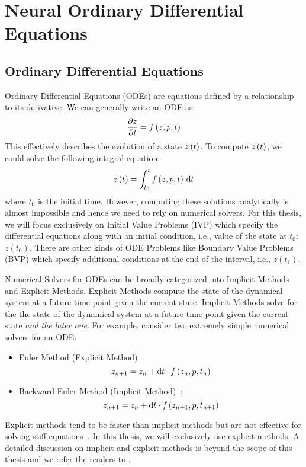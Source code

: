 \chapter{Neural Ordinary Differential Equations}
\label{chapter:neural_ode}

\section{Ordinary Differential Equations}
\label{sec:ordinary_differential_equations}

Ordinary Differential Equations (ODEs) are equations defined by a relationship to its derivative. We can generally write an ODE as:
%
\begin{equation}
  \frac{\partial z}{\partial t} = f\left(z, p, t\right)
\end{equation}
%
This effectively describes the evolution of a state $z\left(t\right)$. To compute $z\left(t\right)$, we could solve the following integral equation:
%
\begin{equation}
  z\left(t\right) = \int_{t_0}^{t} f\left(z, p, t\right) \, \mathrm{d}t
\end{equation}
%
where $t_0$ is the initial time. However, computing these solutions analytically is almost impossible and hence we need to rely on numerical solvers. For this thesis, we will focus exclusively on Initial Value Problems (IVP) which specify the differential equations along with an initial condition, i.e., value of the state at $t_0$: $z(t_0)$. There are other kinds of ODE Problems like Boundary Value Problems (BVP) which specify additional conditions at the end of the interval, i.e., $z(t_1)$.

Numerical Solvers for ODEs can be broadly categorized into Implicit Methods and Explicit Methods. Explicit Methods compute the state of the dynamical system at a future time-point given the current state. Implicit Methods solve for the the state of the dynamical system at a future time-point given the current state \textit{and the later one}. For example, consider two extremely simple numerical solvers for an ODE:
%
\begin{itemize}
  \item Euler Method (Explicit Method)~\citep{euler1824institutionum}:
        \begin{equation}
          z_{n + 1} = z_n + \mathrm{d}t \cdot f\left(z_n, p, t_n\right)
        \end{equation}
  \item Backward Euler Method (Implicit Method)~\citep{euler1824institutionum}:
        \begin{equation}
          z_{n + 1} = z_n + \mathrm{d}t \cdot f\left(z_{n + 1}, p, t_{n + 1}\right)
        \end{equation}
\end{itemize}
%
Explicit methods tend to be faster than implicit methods but are not effective for solving stiff equations~\citep{wanner1996solving,kim2021stiff}. In this thesis, we will exclusively use explicit methods. A detailed discussion on implicit and explicit methods is beyond the scope of this thesis and we refer the readers to \citet{rackauckas2019scimlbook}.

